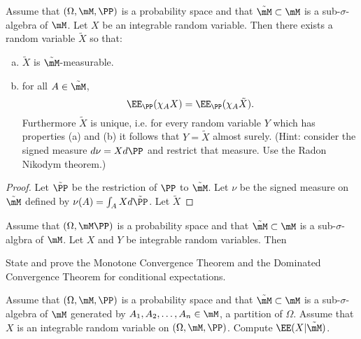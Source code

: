 \documentclass{article}
\begin{document}
 Assume that $(\Omega, \mM, \PP)$ is a probability space and that $\tilde \mM \subset \mM$ is a sub-$\sigma$-algebra of $\mM$. Let $X$ be an integrable random variable. Then there exists a random variable $\tilde X$ so that:
\begin{enumerate}[a)]
\item $\tilde X$ is $\tilde \mM$-measurable.
\item for all $A \in \tilde \mM$,
$$\EE_\PP(\chi_A X) = \EE_\PP(\chi_A \tilde X).$$
Furthermore $\tilde X$ is unique, i.e. for every random variable $Y$ which has properties (a) and (b) it follows that $Y = \tilde X$ almost surely. (Hint: consider the signed measure $d\nu = X d\PP$ and restrict that measure.  Use the Radon Nikodym theorem.)
\end{enumerate}
\begin{proof}
 Let $\tilde \PP$ be the restriction of $\PP$ to $\tilde \mM$.  Let $\nu$ be the signed measure on $\tilde \mM$ defined by $\nu(A) = \int_A X d\tilde \PP$.  Let $\tilde X$

\end{proof}


 Assume that $(\Omega, \mM \PP)$ is a probability space and that $\tilde \mM \subset \mM$ is a sub-$\sigma$-algbra of $\mM$. Let $X$ and $Y$ be integrable random variables. Then

 State and prove the Monotone Convergence Theorem and the Dominated Convergence Theorem for conditional expectations.

 Assume that $(\Omega, \mM, \PP)$ is a probability space and that $\tilde \mM \subset \mM$ is a sub-$\sigma$-algebra of $\mM$ generated by $A_1, A_2, \ldots, A_n \in \mM$, a partition of $\Omega$. Assume that $X$ is an integrable random variable on $(\Omega, \mM, \PP)$. Compute $\EE(X | \tilde \mM)$.
\end{document}
